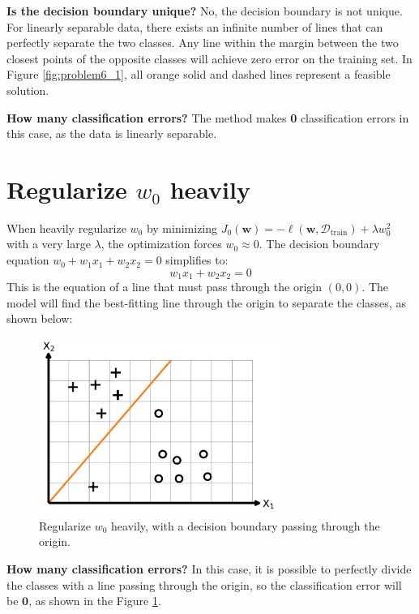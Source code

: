 \documentclass[11pt, a4paper, oneside]{memoir}
\begin{document}
\textbf{Is the decision boundary unique?} No, the decision boundary is not unique. For linearly separable data,
there exists an infinite number of lines that can perfectly separate the two classes.
Any line within the margin between the two closest points of the opposite classes will achieve zero error on the training set.
In Figure \ref{fig:problem6_1}, all orange solid and dashed lines represent a feasible solution.

\textbf{How many classification errors?} The method makes \textbf{0} classification errors in this case, as the data is linearly separable.

\section[Regularize w0 heavily]{Regularize $w_0$ heavily}
When heavily regularize $w_0$ by minimizing $J_0(\mathbf{w}) = -\ell(\mathbf{w}, \mathcal{D}_{\text{train}}) + \lambda w_0^2$ with a very large $\lambda$,
the optimization forces $w_0 \approx 0$. The decision boundary equation $w_0 + w_1x_1 + w_2x_2 = 0$ simplifies to:
\[ w_1x_1 + w_2x_2 = 0 \]
This is the equation of a line that must pass through the origin $(0,0)$.
The model will find the best-fitting line through the origin to separate the classes, as shown below:

\begin{figure}[H]
  \centering
  \includegraphics[width=0.7\textwidth]{code/result/problem6_2.pdf}
  \caption{Regularize $w_0$ heavily, with a decision boundary passing through the origin.}
  \label{fig:problem6_2}
\end{figure}

\textbf{How many classification errors?} In this case, it is possible to perfectly divide the classes
with a line passing through the origin, so the classification error will be $\textbf{0}$, as shown in the Figure \ref{fig:problem6_2}.
\end{document}
